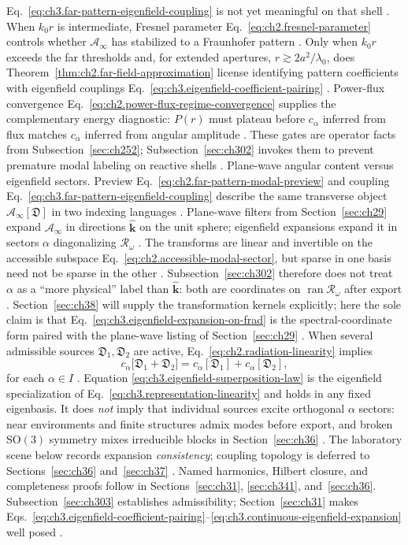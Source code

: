 Eq.~\eqref{eq:ch3.far-pattern-eigenfield-coupling} is not yet meaningful on that shell
. When \(k_0 r\) is intermediate, Fresnel parameter
Eq.~\eqref{eq:ch2.fresnel-parameter} controls whether \(\mathcal{A}_\infty\) has stabilized to a
Fraunhofer pattern . Only when \(k_0 r\) exceeds the far thresholds
and, for extended apertures, \(r\gtrsim 2a^{2}/\lambda_0\), does Theorem~\ref{thm:ch2.far-field-approximation}
license identifying pattern coefficients with eigenfield couplings
Eq.~\eqref{eq:ch3.eigenfield-coefficient-pairing} . Power-flux convergence
Eq.~\eqref{eq:ch2.power-flux-regime-convergence} supplies the complementary energy diagnostic:
\(P(r)\) must plateau before \(c_\alpha\) inferred from flux matches \(c_\alpha\) inferred from
angular amplitude . These gates are operator facts from
Subsection~\ref{sec:ch252}; Subsection~\ref{sec:ch302} invokes them to prevent premature modal labeling
on reactive shells .
Plane-wave angular content versus eigenfield sectors. Preview Eq.~\eqref{eq:ch2.far-pattern-modal-preview} and coupling
Eq.~\eqref{eq:ch3.far-pattern-eigenfield-coupling} describe the same transverse object
\(\mathcal{A}_\infty[\mathfrak{D}]\) in two indexing languages .
Plane-wave filters from Section~\ref{sec:ch29} expand \(\mathcal{A}_\infty\) in directions
\(\hat{\mathbf{k}}\) on the unit sphere; eigenfield expansions expand it in sectors \(\alpha\)
diagonalizing \(\mathcal{R}_\omega\) . The transforms are linear and
invertible on the accessible subspace Eq.~\eqref{eq:ch2.accessible-modal-sector}, but sparse in
one basis need not be sparse in the other . Subsection~\ref{sec:ch302} therefore
does not treat \(\alpha\) as a ``more physical'' label than \(\hat{\mathbf{k}}\): both are
coordinates on \(\operatorname{ran}\mathcal{R}_\omega\) after export . Section~\ref{sec:ch38}
will supply the transformation kernels explicitly; here the sole claim is that
Eq.~\eqref{eq:ch3.eigenfield-expansion-on-frad} is the spectral-coordinate form paired with the
plane-wave listing of Section~\ref{sec:ch29} .
When several admissible sources \(\mathfrak{D}_1,\mathfrak{D}_2\) are active,
Eq.~\eqref{eq:ch2.radiation-linearity} implies
\begin{equation}
\label{eq:ch3.eigenfield-superposition-law}
c_\alpha\big[\mathfrak{D}_1+\mathfrak{D}_2\big]
=
c_\alpha[\mathfrak{D}_1]+c_\alpha[\mathfrak{D}_2],
\end{equation}
for each \(\alpha\in I\) . Equation
\eqref{eq:ch3.eigenfield-superposition-law} is the eigenfield specialization of
Eq.~\eqref{eq:ch3.representation-linearity} and holds in any fixed eigenbasis. It does \emph{not}
imply that individual sources excite orthogonal \(\alpha\) sectors: near environments and finite
structures admix modes before export, and broken \(\mathrm{SO}(3)\) symmetry mixes irreducible
blocks in Section~\ref{sec:ch36} . The laboratory scene below
records expansion \emph{consistency}; coupling topology is deferred to Sections~\ref{sec:ch36}
and~\ref{sec:ch37} .
Named harmonics, Hilbert closure, and completeness proofs follow in
Sections~\ref{sec:ch31}, \ref{sec:ch341}, and~\ref{sec:ch36}. Subsection~\ref{sec:ch303}
establishes admissibility; Section~\ref{sec:ch31} makes
Eqs.~\eqref{eq:ch3.eigenfield-coefficient-pairing}--\eqref{eq:ch3.continuous-eigenfield-expansion}
well posed .
